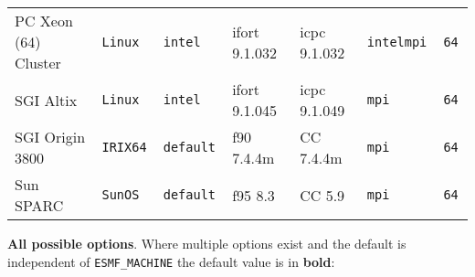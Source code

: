 \begin{tabular}{lllllll}
PC Xeon (64) Cluster &\tt Linux  &\tt intel  & ifort \footnotesize 9.1.032  & icpc \footnotesize 9.1.032  &\tt intelmpi  &\tt 64 \\
SGI Altix      &\tt Linux  &\tt intel   & ifort \footnotesize 9.1.045 & icpc \footnotesize 9.1.049 &\tt mpi   &\tt 64 \\
SGI Origin 3800&\tt IRIX64 &\tt default & f90 \footnotesize 7.4.4m  & CC \footnotesize 7.4.4m   &\tt mpi      &\tt 64 \\
Sun SPARC      &\tt SunOS  &\tt default & f95 \footnotesize 8.3     & CC \footnotesize 5.9      &\tt mpi      &\tt 64
\end{tabular}

\vspace{1ex}

{\bf All possible options}. Where multiple options exist 
and the default is independent of {\tt ESMF\_MACHINE} the default value is in {\bf bold}:

\vspace{1ex}


